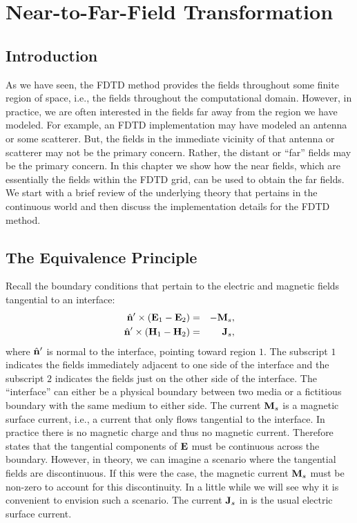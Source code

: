 \chapter{Near-to-Far-Field Transformation \label{chap:nfffTrans}}

\renewcommand{\thefootnote}{\fnsymbol{footnote}}

\section{Introduction}

As we have seen, the FDTD method provides the fields throughout some
finite region of space, i.e., the fields throughout the computational
domain.  However, in practice, we are often interested in the fields
far away from the region we have modeled.  For example, an FDTD
implementation may have modeled an antenna or some scatterer.  But,
the fields in the immediate vicinity of that antenna or scatterer may
not be the primary concern.  Rather, the distant or ``far'' fields may
be the primary concern.  In this chapter we show how the near fields,
which are essentially the fields within the FDTD grid, can be used to
obtain the far fields.  We start with a brief review of the underlying
theory that pertains in the continuous world and then discuss the
implementation details for the FDTD method.

\section{The Equivalence Principle}

Recall the boundary conditions that pertain to the electric and
magnetic fields tangential to an interface:
\begin{eqnarray}
  \hat{\mathbf{n}}'\times(\mathbf{E}_1 - \mathbf{E}_2) &=& -\mathbf{M}_s, \label{eq:eBoundary}\\
  \hat{\mathbf{n}}'\times(\mathbf{H}_1 - \mathbf{H}_2) &=& \mathbf{J}_s, \label{eq:hBoundary}
\end{eqnarray}
where $\hat{\mathbf{n}}'$ is normal to the interface, pointing toward region
$1$.  The subscript $1$ indicates the fields immediately adjacent to
one side of the interface and the subscript $2$ indicates the fields
just on the other side of the interface.  The ``interface'' can either
be a physical boundary between two media or a fictitious boundary with
the same medium to either side.  The current $\mathbf{M}_s$ is a magnetic
surface current, i.e., a current that only flows tangential to the
interface.  In practice there is no magnetic charge and thus no
magnetic current.  Therefore  states that the
tangential components of $\mathbf{E}$ must be continuous across the
boundary.  However, in theory, we can imagine a scenario where the
tangential fields are discontinuous.  If this were the case, the
magnetic current $\mathbf{M}_s$ must be non-zero to account for this
discontinuity.  In a little while we will see why it is convenient to
envision such a scenario.  The current $\mathbf{J}_s$ in 
is the usual electric surface current.

